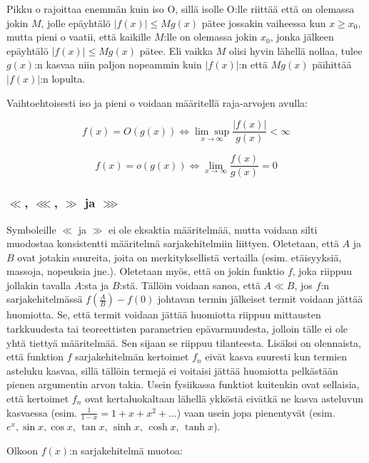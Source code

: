 \documentclass[../johdoksia.tex]{subfiles}
\begin{document}
	Pikku o rajoittaa enemmän kuin iso O, sillä isolle O:lle riittää että on olemassa jokin $M$, jolle epäyhtälö $|f(x)| \leq Mg(x)$ pätee jossakin vaiheessa kun $x \geq x_0$, mutta pieni o vaatii, että kaikille $M$:lle on olemassa jokin $x_0$, jonka jälkeen epäyhtälö $|f(x)| \leq Mg(x)$ pätee. Eli vaikka $M$ olisi hyvin lähellä nollaa, tulee $g(x)$:n kasvaa niin paljon nopeammin kuin $|f(x)|$:n että $Mg(x)$ päihittää $|f(x)|$:n lopulta.
	
	Vaihtoehtoisesti iso ja pieni o voidaan määritellä raja-arvojen avulla:
	
	\begin{equation}
		f(x) = O(g(x)) \iff \underset{x \to \infty}{\lim\sup} \frac{|f(x)|}{g(x)} < \infty
	\end{equation}

	\begin{equation}
		f(x) = o(g(x)) \iff \lim_{x \to \infty}\frac{f(x)}{g(x)} = 0
	\end{equation}
	
	\subsubsection{$\ll$, $\lll$, $\gg$ ja $\ggg$}
	
	Symboleille $\ll$ ja $\gg$ ei ole eksaktia määritelmää, mutta voidaan silti muodostaa konsistentti määritelmä sarjakehitelmiin liittyen. Oletetaan, että $A$ ja $B$ ovat jotakin suureita, joita on merkityksellistä vertailla (esim. etäisyyksiä, massoja, nopeuksia jne.). Oletetaan myös, että on jokin funktio $f$, joka riippuu jollakin tavalla $A$:sta ja $B$:stä. Tällöin voidaan sanoa, että $A \ll B$, jos $f$:n sarjakehitelmässä $f\left(\frac{A}{B}\right) - f(0)$ johtavan termin jälkeiset termit voidaan jättää huomiotta. Se, että termit voidaan jättää huomiotta riippuu mittausten tarkkuudesta tai teoreettisten parametrien epävarmuudesta, jolloin tälle ei ole yhtä tiettyä määritelmää. Sen sijaan se riippuu tilanteesta. Lisäksi on olennaista, että funktion $f$ sarjakehitelmän kertoimet $f_n$ eivät kasva suuresti kun termien asteluku kasvaa, sillä tällöin termejä ei voitaisi jättää huomiotta pelkästään pienen argumentin arvon takia. Usein fysiikassa funktiot kuitenkin ovat sellaisia, että kertoimet $f_n$ ovat kertaluokaltaan lähellä ykköstä eivätkä ne kasva asteluvun kasvaessa (esim. $\frac{1}{1 - x} = 1 + x + x^2 + \dots$) vaan usein jopa pienentyvät (esim. $e^x, \sin x, \cos x$, $\tan x$, $\sinh x$, $\cosh x$, $\tanh x$).
	
	Olkoon $f(x)$:n sarjakehitelmä muotoa:
	
\end{document}
